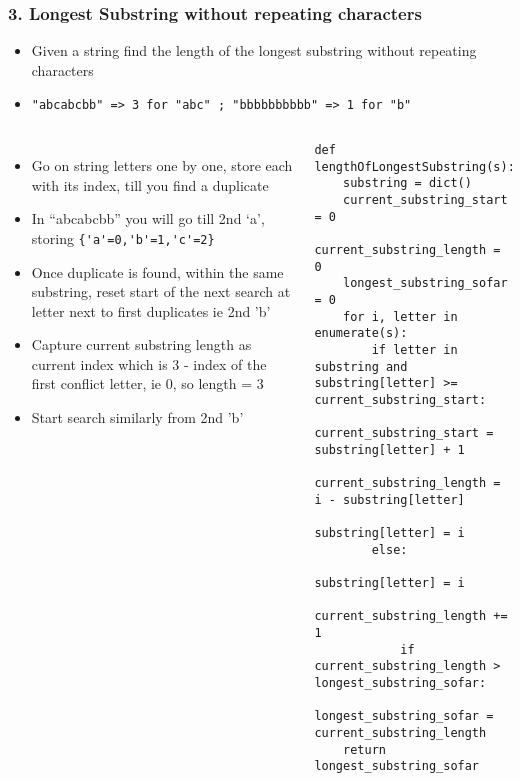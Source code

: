 \begin{frame}[fragile]\frametitle{3. Longest Substring without repeating characters}


	\begin{itemize}
	\item Given a string find the length of the longest substring without repeating characters
	\item \lstinline|"abcabcbb" => 3 for "abc" ; "bbbbbbbbbb" => 1 for "b"|
	\end{itemize}
	
	\begin{columns}[T]
	\begin{itemize}
	\item Go on string letters one by one, store each with its index, till you find a duplicate 
	\item In ``abcabcbb'' you will go till 2nd `a', storing \lstinline|{'a'=0,'b'=1,'c'=2}| 
	\item Once duplicate is found, within the same substring, reset start of the next search at letter next to first duplicates ie 2nd 'b'
	\item Capture current substring length as current index which is 3 - index of the first conflict letter, ie 0, so length = 3
	\item Start search similarly from 2nd 'b'
	\end{itemize}
		\begin{lstlisting}[basicstyle=\scriptsize]
def lengthOfLongestSubstring(s):
    substring = dict()
    current_substring_start = 0
    current_substring_length = 0
    longest_substring_sofar = 0
    for i, letter in enumerate(s):
        if letter in substring and substring[letter] >= current_substring_start:
            current_substring_start = substring[letter] + 1
            current_substring_length = i - substring[letter]
            substring[letter] = i
        else:
            substring[letter] = i
            current_substring_length += 1
            if current_substring_length > longest_substring_sofar:
                longest_substring_sofar = current_substring_length
    return longest_substring_sofar
				\end{lstlisting}		
	\end{columns}
	
\end{frame}

